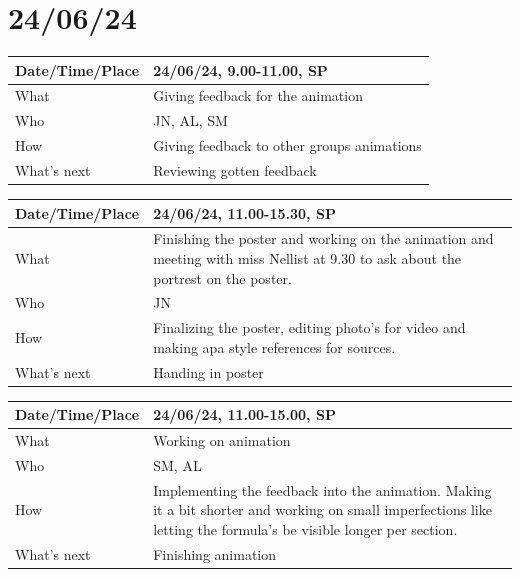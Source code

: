 \documentclass{article}
\begin{document}
\section{24/06/24}

\begin{table}[H]
\begin{tabular}{|p{1.5in}|p{4in}|}
\hline
Date/Time/Place & 24/06/24, 9.00-11.00, SP \\ \hline
What            & Giving feedback for the animation \\ \hline
Who             & JN, AL, SM \\ \hline
How             & Giving feedback to other groups animations \\ \hline
What's next     & Reviewing gotten feedback \\ \hline
\end{tabular}
\end{table}

\begin{table}[H]
\begin{tabular}{|p{1.5in}|p{4in}|}
\hline
Date/Time/Place & 24/06/24, 11.00-15.30, SP \\ \hline
What            & Finishing the poster and working on the animation and meeting with miss Nellist at 9.30 to ask about the portrest on the poster.\\ \hline
Who             & JN \\ \hline
How             & Finalizing the poster, editing photo's for video and making apa style references  for sources.\\ \hline
What's next     & Handing in poster \\ \hline
\end{tabular}
\end{table}

\begin{table}[H]
\begin{tabular}{|p{1.5in}|p{4in}|}
\hline
Date/Time/Place & 24/06/24, 11.00-15.00, SP \\ \hline
What            & Working on animation \\ \hline
Who             & SM, AL \\ \hline
How             & Implementing the feedback into the animation. Making it a bit shorter and working on small imperfections like letting the formula's be visible longer per section.\\ \hline
What's next     & Finishing animation \\ \hline
\end{tabular}
\end{table}
\end{document}
